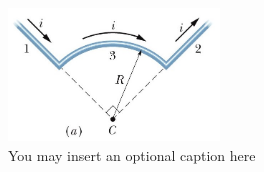 \documentclass[letterpaper,12pt]{article}
\begin{document}
\begin{figure}[h] %
    \begin{center}
        \includegraphics[width=0.5\textwidth]{halliday_10e_fig_29_08.jpg} %
        \caption{You may insert an optional caption here}
        \label{fig:example}
    \end{center}
\end{figure}
\end{document}
